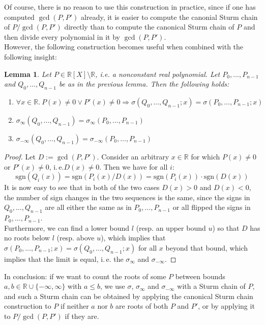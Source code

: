 \documentclass[11pt,a4paper,oneside]{article}
\newtheorem{lemma}[definition]{Lemma}
\newcommand{\RR}{\mathbb{R}}
\newcommand{\ie}{i.\,e.\xspace}
\begin{document}
Of course, there is no reason to use this construction in practice, since if one has computed $\gcd(P,P')$ already, it is easier to compute the canonial Sturm chain of $P/\gcd(P,P')$ directly than to compute the canonical Sturm chain of $P$ and then divide every polynomial in it by $\gcd(P,P')$.\\
However, the following construction becomes useful when combined with the following insight:
\begin{lemma}\label{thm:sturm_multiple_aux2}
Let $P\in\RR[X]\setminus\RR$, i.e. a nonconstant real polynomial. Let $P_0, \ldots, P_{n-1}$ and $Q_0,\ldots, Q_{n-1}$ be as in the previous lemma. Then the following holds:
\begin{enumerate}
\item $\forall x\in\RR.\ P(x)\neq 0\vee P'(x)\neq 0 \Longrightarrow \sigma(Q_0, \ldots, Q_{n-1}; x) = \sigma(P_0, \ldots, P_{n-1}; x)$
\item $\sigma_\infty(Q_0, \ldots, Q_{n-1}) = \sigma_\infty(P_0, \ldots, P_{n-1})$
\item $\sigma_{-\infty}(Q_0, \ldots, Q_{n-1}) = \sigma_{-\infty}(P_0, \ldots, P_{n-1})$
\end{enumerate}
\end{lemma}
\begin{proof}
Let $D:=\gcd(P,P')$. Consider an arbitrary $x\in\RR$ for which $P(x)\neq 0$ or $P'(x)\neq 0$, \ie $D(x)\neq 0$. Then we have for all $i$:
$$\mathrm{sgn}(Q_i(x)) = \mathrm{sgn}(P_i(x) / D(x)) = \mathrm{sgn}(P_i(x)) \cdot \mathrm{sgn}(D(x))$$
It is now easy to see that in both of the two cases $D(x)>0$ and $D(x)<0$, the number of sign changes in the two sequences is the same, since the signs in $Q_0,\ldots, Q_{n-1}$ are all either the same as in $P_0,\ldots, P_{n-1}$ or all flipped \wrt the signs in $P_0,\ldots,P_{n-1}$.\\
Furthermore, we can find a lower bound $l$ (resp. an upper bound $u$) so that $D$ has no roots below $l$ (resp. above $u$), which implies that $\sigma(P_0,\ldots,P_{n-1}; x) = \sigma(Q_0,\ldots,Q_{n-1};x)$ for all $x$ beyond that bound, which implies that the limit is equal, \ie the $\sigma_\infty$ and $\sigma_{-\infty}$.
\end{proof}

In conclusion: if we want to count the roots of some $P$ between bounds $a,b\in\RR\cup\{-\infty,\infty\}$ with $a\leq b$, we use $\sigma$, $\sigma_\infty$ and $\sigma_{-\infty}$ with a Sturm chain of $P$, and such a Sturm chain can be obtained by applying the canonical Sturm chain construction to $P$ if neither $a$ nor $b$ are roots of both $P$ and $P'$, or by applying it to $P/\gcd(P,P')$ if they are.
\end{document}
